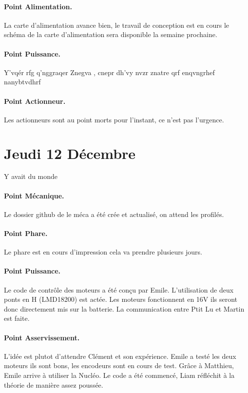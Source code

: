 \documentclass[a4paper,10pt]{report}
\begin{document}
\begin{spacing}{1.5}
\paragraph*{Point Alimentation.}
La carte d'alimentation avance bien, le travail de conception est en cours le
schéma de la carte d'alimentation sera disponible la semaine prochaine.

\paragraph*{Point Puissance.}
Y'vqér rfg q'nggraqer Znegva , cnepr dh'vy nvzr znatre qrf enqvngrhef nanybtvdhrf

\paragraph*{Point Actionneur.}
Les actionneurs sont au point morts pour l'instant, ce n'est pas l'urgence.

\newpage
\section*{Jeudi 12 Décembre}
Y avait du monde
\paragraph{Point Mécanique.}
Le dossier github de le méca a été crée et actualisé, on attend les profilés.
\paragraph{Point Phare.}
Le phare est en cours d'impression cela va prendre plusieurs jours.
\paragraph{Point Puissance.}
Le code de contrôle des moteurs a été conçu par Emile. L'utilisation de deux
ponts en H (LMD18200) est actée. Les moteurs fonctionnent en 16V ils seront donc
directement mis sur la batterie. La communication entre Ptit Lu et Martin est
faite.
\paragraph{Point Asservissement.}
L'idée est plutot d'attendre Clément et son expérience. Emile a testé les deux
moteurs ils sont bons, les encodeurs sont en cours de test. Grâce à Matthieu,
Emile arrive à utiliser la Nucléo. Le code a été commencé, Liam réfléchit à la
théorie de manière assez poussée.

\end{spacing}
\end{document}
